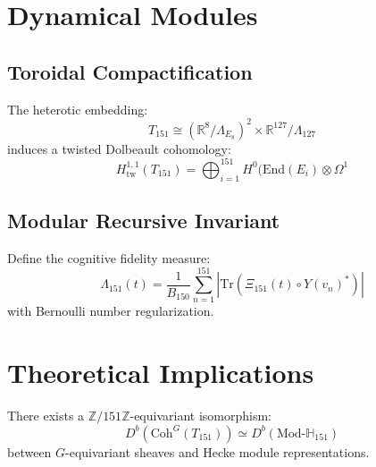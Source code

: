 \documentclass[12pt]{article}
\begin{document}
\begin{center}

\section{Dynamical Modules}
\subsection{Toroidal Compactification}
The heterotic embedding:
\begin{equation}
T_{151} \cong \left(\mathbb{R}^8/\Lambda_{E_8}\right)^2 \times \mathbb{R}^{127}/\Lambda_{127}
\end{equation}
induces a twisted Dolbeault cohomology:
\begin{equation}
H^{1,1}_{\text{tw}}(T_{151}) = \bigoplus_{i=1}^{151} H^0(\text{End}(E_i)\otimes \Omega^1
\end{equation}

\subsection{Modular Recursive Invariant}
Define the cognitive fidelity measure:
\begin{equation}
\Lambda_{151}(t) = \frac{1}{B_{150}}\sum_{n=1}^{151} \left|\text{Tr}\left(\Xi_{151}(t)\circ Y(v_n)^*\right)\right|
\end{equation}
with Bernoulli number regularization.

\section{Theoretical Implications}
\begin{theorem}
There exists a $\mathbb{Z}/151\mathbb{Z}$-equivariant isomorphism:
\begin{equation}
D^b(\text{Coh}^{G}(T_{151})) \simeq D^b(\text{Mod-}\mathbb{H}_{151})
\end{equation}
between $G$-equivariant sheaves and Hecke module representations.
\end{theorem}


\end{center}
\end{document}
